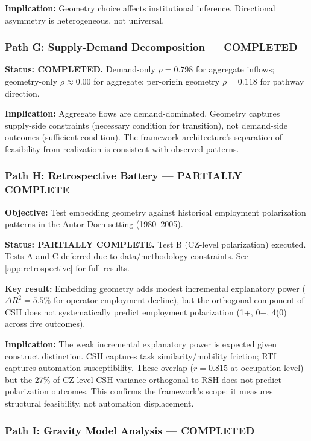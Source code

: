 \documentclass[12pt]{article}
\begin{document}
\textbf{Implication:} Geometry choice affects institutional inference. Directional asymmetry is heterogeneous, not universal.


\subsubsection{Path G: Supply-Demand Decomposition --- COMPLETED}


\textbf{Status: COMPLETED.} Demand-only $\rho = 0.798$ for aggregate inflows; geometry-only $\rho \approx 0.00$ for aggregate; per-origin geometry $\rho = 0.118$ for pathway direction.

\textbf{Implication:} Aggregate flows are demand-dominated. Geometry captures supply-side constraints (necessary condition for transition), not demand-side outcomes (sufficient condition). The framework architecture's separation of feasibility from realization is consistent with observed patterns.


\subsubsection{Path H: Retrospective Battery --- PARTIALLY COMPLETE}


\textbf{Objective:} Test embedding geometry against historical employment polarization patterns in the Autor-Dorn setting (1980--2005).

\textbf{Status: PARTIALLY COMPLETE.} Test B (CZ-level polarization) executed. Tests A and C deferred due to data/methodology constraints. See \cref{app:retrospective} for full results.

\textbf{Key result:} Embedding geometry adds modest incremental explanatory power ($\Delta R^2 = 5.5\%$ for operator employment decline), but the orthogonal component of CSH does not systematically predict employment polarization (1+, 0$-$, 4(0) across five outcomes).

\textbf{Implication:} The weak incremental explanatory power is expected given construct distinction. CSH captures task similarity/mobility friction; RTI captures automation susceptibility. These overlap ($r = 0.815$ at occupation level) but the 27\% of CZ-level CSH variance orthogonal to RSH does not predict polarization outcomes. This confirms the framework's scope: it measures structural feasibility, not automation displacement.


\subsubsection{Path I: Gravity Model Analysis --- COMPLETED}
\end{document}
